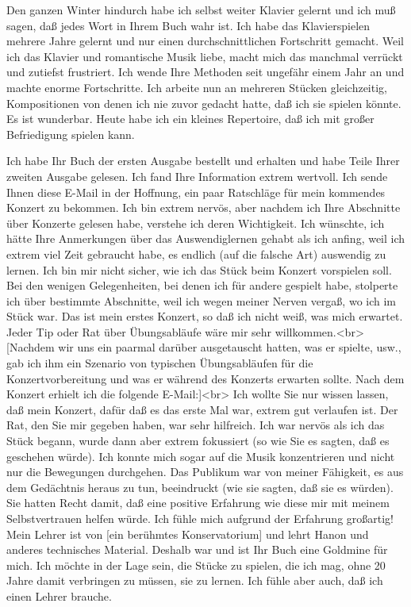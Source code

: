 \item \label{testimonials23}
Den ganzen Winter hindurch habe ich selbst weiter Klavier gelernt und ich muß sagen, daß jedes Wort in Ihrem Buch wahr ist.
Ich habe das Klavierspielen mehrere Jahre gelernt und nur einen durchschnittlichen Fortschritt gemacht.
Weil ich das Klavier und romantische Musik liebe, macht mich das manchmal verrückt und zutiefst frustriert.
Ich wende Ihre Methoden seit ungefähr einem Jahr an und machte enorme Fortschritte.
Ich arbeite nun an mehreren Stücken gleichzeitig, Kompositionen von denen ich nie zuvor gedacht hatte, daß ich sie spielen könnte.
Es ist wunderbar.
Heute habe ich ein kleines Repertoire, daß ich mit großer Befriedigung spielen kann.


\item \label{testimonials24}
Ich habe Ihr Buch der ersten Ausgabe bestellt und erhalten und habe Teile Ihrer zweiten Ausgabe gelesen.
Ich fand Ihre Information extrem wertvoll.
Ich sende Ihnen diese E-Mail in der Hoffnung, ein paar Ratschläge für mein kommendes Konzert zu bekommen.
Ich bin extrem nervös, aber nachdem ich Ihre Abschnitte über Konzerte gelesen habe, verstehe ich deren Wichtigkeit.
Ich wünschte, ich hätte Ihre Anmerkungen über das Auswendiglernen gehabt als ich anfing, weil ich extrem viel Zeit gebraucht habe, es endlich (auf die falsche Art) auswendig zu lernen.
Ich bin mir nicht sicher, wie ich das Stück beim Konzert vorspielen soll.
Bei den wenigen Gelegenheiten, bei denen ich für andere gespielt habe, stolperte ich über bestimmte Abschnitte, weil ich wegen meiner Nerven vergaß, wo ich im Stück war.
Das ist mein erstes Konzert, so daß ich nicht weiß, was mich erwartet.
Jeder Tip oder Rat über Übungsabläufe wäre mir sehr willkommen.<br>
[Nachdem wir uns ein paarmal darüber ausgetauscht hatten, was er spielte, usw., gab ich ihm ein Szenario von typischen Übungsabläufen für die Konzertvorbereitung und was er während des Konzerts erwarten sollte.
Nach dem Konzert erhielt ich die folgende E-Mail:]<br>
Ich wollte Sie nur wissen lassen, daß mein Konzert, dafür daß es das erste Mal war, extrem gut verlaufen ist.
Der Rat, den Sie mir gegeben haben, war sehr hilfreich.
Ich war nervös als ich das Stück begann, wurde dann aber extrem fokussiert (so wie Sie es sagten, daß es geschehen würde).
Ich konnte mich sogar auf die Musik konzentrieren und nicht nur die Bewegungen durchgehen.
Das Publikum war von meiner Fähigkeit, es aus dem Gedächtnis heraus zu tun, beeindruckt (wie sie sagten, daß sie es würden).
Sie hatten Recht damit, daß eine positive Erfahrung wie diese mir mit meinem Selbstvertrauen helfen würde.
Ich fühle mich aufgrund der Erfahrung großartig!
Mein Lehrer ist von [ein berühmtes Konservatorium] und lehrt Hanon und anderes technisches Material.
Deshalb war und ist Ihr Buch eine Goldmine für mich.
Ich möchte in der Lage sein, die Stücke zu spielen, die ich mag, ohne 20 Jahre damit verbringen zu müssen, sie zu lernen.
Ich fühle aber auch, daß ich einen Lehrer brauche.


